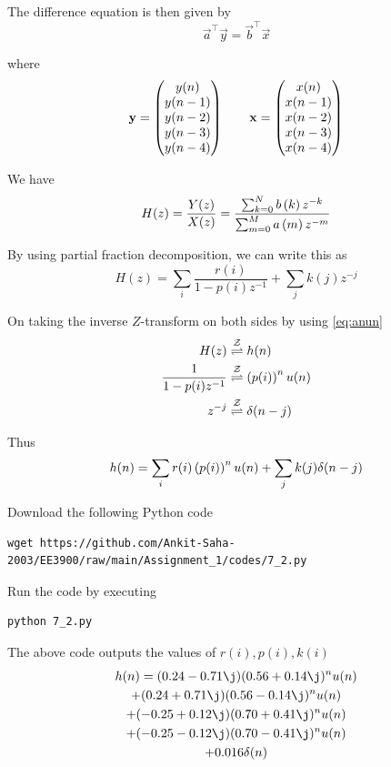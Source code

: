 \documentclass[journal,12pt,twocolumn]{IEEEtran}
\renewcommand\thesection{\arabic{section}}
\begin{document}
\begin{enumerate}[label=\thesection.\arabic*]
	The difference equation is then given by
	\begin{equation}
		\vec{a}^\top \vec{y} = \vec{b}^\top \vec{x} 
	\end{equation}
	
	where
	\begin{align}
		\mathbf{y} = \begin{pmatrix}y(n) \\ y(n-1) \\ y(n-2) \\ y(n-3) \\ y(n-4)\end{pmatrix} \qquad
		\mathbf{x} = \begin{pmatrix}x(n) \\ x(n-1) \\ x(n-2) \\ x(n-3) \\ x(n-4)\end{pmatrix}
	\end{align}
	
	We have
	\begin{equation}
		H(z) = \frac{Y(z)}{X(z)} = \frac{\sum _{k=0}^{N}b\left(k\right) z^{-k}}{\sum _{m=0}^{M}a\left(m\right) z^{-m}}
	\end{equation}
	
	By using partial fraction decomposition, we can write this as
	\begin{equation}
		H(z) = \sum_i \frac{r(i)}{1-p(i)z^{-1}} + \sum_j k(j)z^{-j}
	\end{equation}
	
	On taking the inverse $Z$-transform on both sides by using \eqref{eq:anun}
	\begin{align}
		H(z) &\overset{\mathcal{Z}}{ \rightleftharpoons} h(n) \\
		\frac{1}{1-p(i)z^{-1}} &\overset{\mathcal{Z}}{ \rightleftharpoons} \left(p(i)\right)^nu(n) \\
		z^{-j} &\overset{\mathcal{Z}}{ \rightleftharpoons} \delta(n-j) 
	\end{align}
	
	Thus
	\begin{align}
		h(n) = \sum_i r(i)\left(p(i)\right)^nu(n) + \sum_j k(j)\delta(n-j)
	\end{align}
	
	Download the following Python code
	\begin{lstlisting}
wget https://github.com/Ankit-Saha-2003/EE3900/raw/main/Assignment_1/codes/7_2.py
	\end{lstlisting}
	
	Run the code by executing
	\begin{lstlisting}
python 7_2.py
	\end{lstlisting}
	
	The above code outputs the values of $r(i), p(i), k(i)$
	\begin{multline}
		h(n) = 
		 (0.24 - 0.71\j)(0.56 + 0.14\j)^n u(n) \\
		+ (0.24 + 0.71\j)(0.56 - 0.14\j)^n u(n) \\
		+ (-0.25 + 0.12\j)(0.70 + 0.41\j)^n u(n) \\
		+ (-0.25 - 0.12\j)(0.70 - 0.41\j)^n u(n) \\
		+ 0.016\delta(n)
	\end{multline}
	

\end{enumerate}
\end{document}

